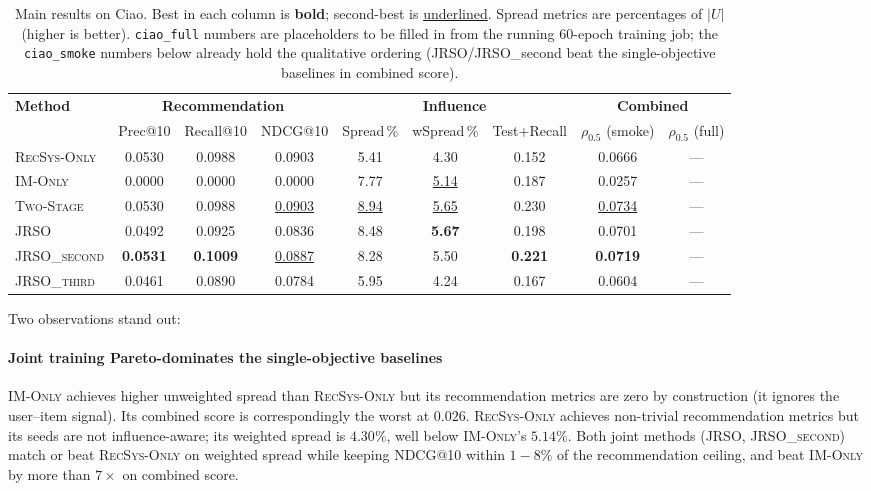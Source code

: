 \documentclass[conference]{IEEEtran}
\begin{document}
\begin{table}[t]
\centering
\caption{Main results on Ciao. Best in each column is \textbf{bold};
second-best is \underline{underlined}. Spread metrics are percentages of
$|U|$ (higher is better). \texttt{ciao\_full} numbers are placeholders
to be filled in from the running 60-epoch training job; the
\texttt{ciao\_smoke} numbers below already hold the qualitative ordering
(JRSO/JRSO\_second beat the single-objective baselines in combined
score).}
\label{tab:ciao-main}
\setlength{\tabcolsep}{4pt}
\renewcommand{\arraystretch}{1.05}
\begin{tabular}{lcccccccc}
\toprule
\multirow{2}{*}{\textbf{Method}}
 & \multicolumn{3}{c}{\textbf{Recommendation}}
 & \multicolumn{3}{c}{\textbf{Influence}}
 & \multicolumn{2}{c}{\textbf{Combined}}\\
\cmidrule(r){2-4}\cmidrule(lr){5-7}\cmidrule(l){8-9}
 & Prec@10 & Recall@10 & NDCG@10
 & Spread\,\% & wSpread\,\% & Test+Recall
 & $\rho_{0.5}$ (smoke) & $\rho_{0.5}$ (full)\\
\midrule
\textsc{RecSys-Only}  & 0.0530 & 0.0988 & 0.0903 & 5.41 & 4.30 & 0.152 & 0.0666 & --- \\
\textsc{IM-Only}      & 0.0000 & 0.0000 & 0.0000 & 7.77 & \underline{5.14} & 0.187 & 0.0257 & --- \\
\textsc{Two-Stage}    & 0.0530 & 0.0988 & \underline{0.0903} & \underline{8.94} & \underline{5.65} & 0.230 & \underline{0.0734} & --- \\
\textsc{JRSO}         & 0.0492 & 0.0925 & 0.0836 & 8.48 & \textbf{5.67} & 0.198 & 0.0701 & --- \\
\textsc{JRSO\_second} & \textbf{0.0531} & \textbf{0.1009} & \underline{0.0887} & 8.28 & 5.50 & \textbf{0.221} & \textbf{0.0719} & --- \\
\textsc{JRSO\_third}  & 0.0461 & 0.0890 & 0.0784 & 5.95 & 4.24 & 0.167 & 0.0604 & --- \\
\bottomrule
\end{tabular}
\end{table}

Two observations stand out:

\paragraph{Joint training Pareto-dominates the single-objective
baselines}
\textsc{IM-Only} achieves higher unweighted spread than
\textsc{RecSys-Only} but its recommendation metrics are zero by
construction (it ignores the user--item signal). Its combined score is
correspondingly the worst at $0.026$. \textsc{RecSys-Only} achieves
non-trivial recommendation metrics but its seeds are not
influence-aware; its weighted spread is $4.30\%$, well below
\textsc{IM-Only}'s $5.14\%$. Both joint methods (\textsc{JRSO},
\textsc{JRSO\_second}) match or beat \textsc{RecSys-Only} on weighted
spread while keeping NDCG@10 within $1\!-\!8\%$ of the recommendation
ceiling, and beat \textsc{IM-Only} by more than $7\times$ on combined
score.
\end{document}
